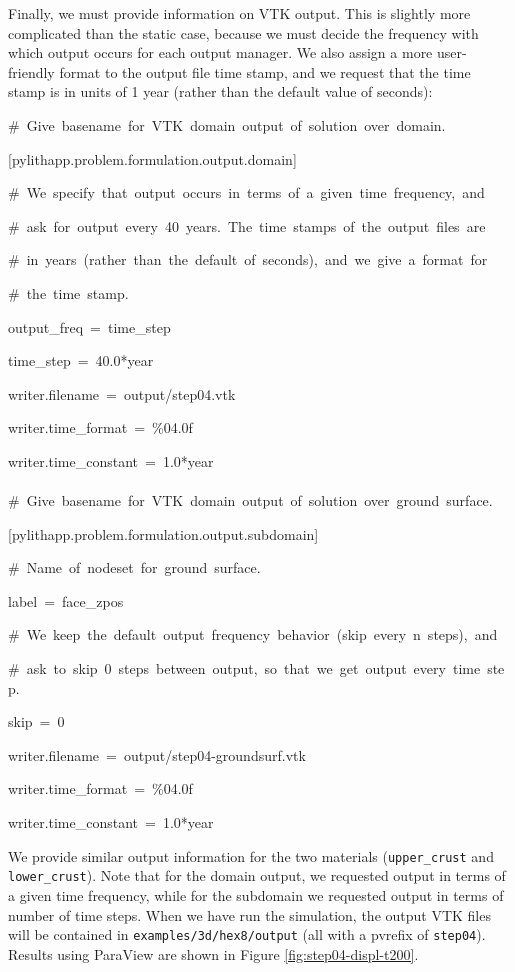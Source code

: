 Finally, we must provide information on VTK output. This is slightly
more complicated than the static case, because we must decide the
frequency with which output occurs for each output manager. We also
assign a more user-friendly format to the output file time stamp,
and we request that the time stamp is in units of 1 year (rather than
the default value of seconds):
\begin{lyxcode}
\#~Give~basename~for~VTK~domain~output~of~solution~over~domain.

{[}pylithapp.problem.formulation.output.domain{]}

\#~We~specify~that~output~occurs~in~terms~of~a~given~time~frequency,~and

\#~ask~for~output~every~40~years.~The~time~stamps~of~the~output~files~are

\#~in~years~(rather~than~the~default~of~seconds),~and~we~give~a~format~for

\#~the~time~stamp.

output\_freq~=~time\_step

time\_step~=~40.0{*}year

writer.filename~=~output/step04.vtk

writer.time\_format~=~\%04.0f

writer.time\_constant~=~1.0{*}year~\\
~\\


\#~Give~basename~for~VTK~domain~output~of~solution~over~ground~surface.

{[}pylithapp.problem.formulation.output.subdomain{]}

\#~Name~of~nodeset~for~ground~surface.

label~=~face\_zpos

\#~We~keep~the~default~output~frequency~behavior~(skip~every~n~steps),~and

\#~ask~to~skip~0~steps~between~output,~so~that~we~get~output~every~time~step.

skip~=~0

writer.filename~=~output/step04-groundsurf.vtk

writer.time\_format~=~\%04.0f

writer.time\_constant~=~1.0{*}year
\end{lyxcode}
We provide similar output information for the two materials (\texttt{upper\_crust}
and \texttt{lower\_crust}). Note that for the domain output, we requested
output in terms of a given time frequency, while for the subdomain
we requested output in terms of number of time steps. When we have
run the simulation, the output VTK files will be contained in \texttt{examples/3d/hex8/output}
(all with a pvrefix of \texttt{step04}). Results using ParaView are
shown in Figure \vref{fig:step04-displ-t200}.

